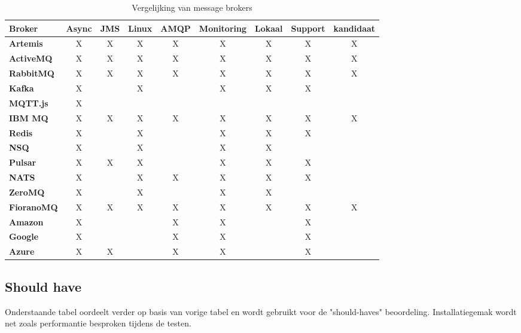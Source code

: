 \begin{table}[h!]
  \centering
  \footnotesize
\begin{tabular}{|l|c|c|c|c|c|c|c|c|}
  \hline
  \textbf{Broker} & \textbf{Async} & \textbf{JMS} & \textbf{Linux} & \textbf{AMQP} & \textbf{Monitoring} & \textbf{Lokaal} & \textbf{Support} & \textbf{kandidaat}\\ \hline
  \textbf{Artemis}   & X & X & X & X & X & X & X & X \\ \hline
  \textbf{ActiveMQ}  & X & X & X & X & X & X & X & X \\ \hline
  \textbf{RabbitMQ}  & X & X & X & X & X & X & X & X \\ \hline
  \textbf{Kafka}     & X &   & X &   & X & X & X &   \\ \hline
  \textbf{MQTT.js}   & X &   &   &   &   &   &   &   \\ \hline
  \textbf{IBM MQ}    & X & X & X & X & X & X & X & X \\ \hline
  \textbf{Redis}     & X &   & X &   & X & X & X &   \\ \hline
  \textbf{NSQ}       & X &   & X &   & X & X &   &   \\ \hline
  \textbf{Pulsar}    & X & X & X &   & X & X & X &   \\ \hline
  \textbf{NATS}      & X &   & X & X & X & X & X &   \\ \hline
  \textbf{ZeroMQ}    & X &   & X &   & X & X &   &   \\ \hline
  \textbf{FioranoMQ} & X & X & X & X & X & X & X & X \\ \hline
  \textbf{Amazon}    & X &   &   & X & X &   & X &   \\ \hline
  \textbf{Google}    & X &   &   & X & X &   & X &   \\ \hline
  \textbf{Azure}     & X & X &   & X & X &   & X &   \\ \hline
\end{tabular}
\caption{Vergelijking van message brokers}
\label{tab:vergelijking_message_brokers_must_have}
\end{table}

\subsection{Should have} 
Onderstaande tabel oordeelt verder op basis van vorige tabel en wordt gebruikt voor de "should-haves" beoordeling.
Installatiegemak wordt net zoals performantie besproken tijdens de testen.

